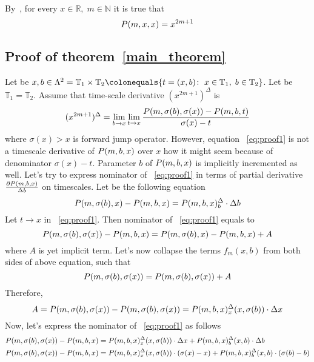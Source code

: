 By~\cite[Lemma 3.1]{kolosov2016link}, for every $x\in\mathbb{R}, \; m\in\mathbb{N}$ it is true that
\begin{equation}
    \label{eq:odd_power_identity}
    P ( m, x, x ) = x^{2m+1}
\end{equation}

\subsection*{Proof of theorem~\ref{main_theorem}}
Let be
$x,b\in \Lambda^2 = \mathbb{T}_1 \times \mathbb{T}_2
\colonequals \{t = (x,b) \colon \; x\in\mathbb{T}_1, \; b\in\mathbb{T}_2\}$.
Let be $\mathbb{T}_1 = \mathbb{T}_2$.
Assume that time-scale derivative $(x^{2m+1})^{\Delta}$ is
\begin{equation}
    \label{eq:proof1}
    (x^{2m+1})^{\Delta}
    = \lim \limits_{b \to x}
    \lim \limits_{t \to x}
    \frac{P ( m, \sigma(b), \sigma(x) ) - P ( m, b, t )}{\sigma(x) - t}
\end{equation}
where $\sigma(x) > x$ is forward jump operator.
However, equation ~\eqref{eq:proof1} is not a timescale derivative of $P ( m, b, x )$ over $x$
how it might seem because of denominator $\sigma(x) - t$.
Parameter $b$ of $P ( m, b, x )$ is implicitly incremented as well.
Let's try to express nominator of ~\eqref{eq:proof1} in terms of
partial derivative $\frac{\partial P ( m, b, x )}{\Delta b}$ on timescales.
Let be the following equation
\[
    P ( m, \sigma(b), x ) - P ( m, b, x )
    = P ( m, b, x )^{\Delta}_{b} \cdot \Delta b
\]
Let $t \to x$ in ~\eqref{eq:proof1}.
Then nominator of ~\eqref{eq:proof1} equals to
\[
    P ( m, \sigma(b), \sigma(x) ) - P ( m, b, x )
    = P ( m, \sigma(b), x ) - P ( m, b, x ) + A
\]
where $A$ is yet implicit term.
Let's now collapse the terms $f_m (x, b)$ from both sides of above equation, such that
\[
    P ( m, \sigma(b), \sigma(x) ) = P ( m, \sigma(b), \sigma(x) ) + A
\]
Therefore,
\[
    A = P ( m, \sigma(b), \sigma(x) ) - P ( m, \sigma(b), \sigma(x) )
    = P ( m, b, x )^{\Delta}_{x} (x, \sigma(b)) \cdot \Delta x
\]
Now, let's express the nominator of ~\eqref{eq:proof1} as follows
\begin{align*}
    P ( m, \sigma(b), \sigma(x) ) - P ( m, b, x )
    &= P ( m, b, x )^{\Delta}_{x} (x, \sigma(b)) \cdot \Delta x + P ( m, b, x )^{\Delta}_{b} (x,b) \cdot \Delta b \\
    P ( m, \sigma(b), \sigma(x) ) - P ( m, b, x )
    &= P ( m, b, x )^{\Delta}_{x} (x, \sigma(b)) \cdot (\sigma(x) - x) + P ( m, b, x )^{\Delta}_{b} (x,b) \cdot (\sigma(b) - b)
\end{align*}
